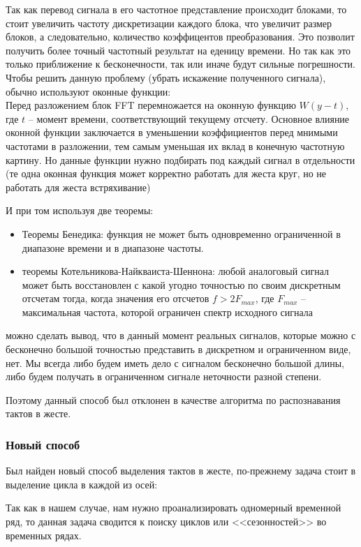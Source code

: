 Так как перевод сигнала в его частотное представление происходит блоками, то стоит увеличить частоту дискретизации каждого блока, что увеличит размер блоков, а следовательно, количество коэффицентов преобразования. Это позволит получить более точный частотный результат на еденицу времени. Но так как это только приближение к бесконечности, так или иначе будут сильные погрешности. \\

Чтобы решить данную проблему (убрать искажение полученного сигнала), обычно используют оконные функции: \\
Перед разложением блок FFT перемножается на оконную функцию $W(y - t)$, где $t$ -- момент времени, соответствующий текущему отсчету. Основное влияние оконной функции заключается в уменьшении коэффициентов перед мнимыми частотами в разложении, тем самым уменьшая их вклад в конечную частотную картину. Но данные функции нужно подбирать под каждый сигнал в отдельности (те одна оконная функция может корректно работать для жеста круг, но не работать для жеста встряхивание)

И при том используя две теоремы:
\begin{itemize}
    \item Теоремы Бенедика: функция не может быть одновременно ограниченной в диапазоне времени и в диапазоне частоты.
    \item теоремы Котельникова-Найкваиста-Шеннона: любой аналоговый сигнал может быть восстановлен с какой угодно точностью по своим дискретным отсчетам тогда, когда значения его отсчетов $f > 2 F_{max}$, где $F_{max}$ -- максимальная частота, которой ограничен спектр исходного сигнала
\end{itemize}
можно сделать вывод, что в данный момент реальных сигналов, которые можно с бесконечно большой точностью представить в дискретном и ограниченном виде, нет. Мы всегда либо будем иметь дело с сигналом бесконечно большой длины, либо будем получать в ограниченном сигнале неточности разной степени.

Поэтому данный способ был отклонен в качестве алгоритма по распознавания тактов в жесте.

\subsubsection{Новый способ}
Был найден новый способ выделения тактов в жесте, по-прежнему задача стоит в выделение цикла в каждой из осей:

Так как в нашем случае, нам нужно проанализировать одномерный временной ряд, то данная задача сводится к поиску циклов или <<сезонностей>> во временных рядах.

